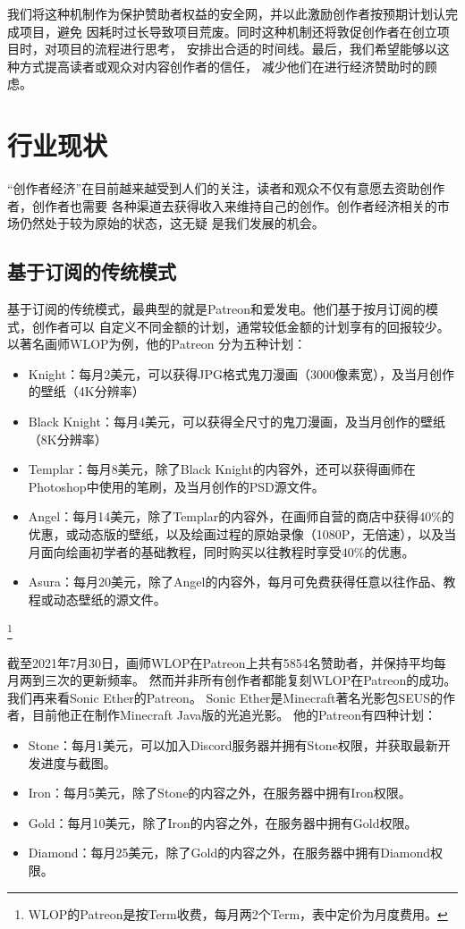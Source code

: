\documentclass[11pt,UTF8,a4paper]{ctexart}
\begin{document}
    我们将这种机制作为保护赞助者权益的安全网，并以此激励创作者按预期计划认完成项目，避免
    因耗时过长导致项目荒废。同时这种机制还将敦促创作者在创立项目时，对项目的流程进行思考，
    安排出合适的时间线。最后，我们希望能够以这种方式提高读者或观众对内容创作者的信任，
    减少他们在进行经济赞助时的顾虑。


    \section{行业现状}\label{sec:now}

    “创作者经济”在目前越来越受到人们的关注，读者和观众不仅有意愿去资助创作者，创作者也需要
    各种渠道去获得收入来维持自己的创作。创作者经济相关的市场仍然处于较为原始的状态，这无疑
    是我们发展的机会。

    \subsection{基于订阅的传统模式}\label{subsec:tradition_patreon}

    基于订阅的传统模式，最典型的就是Patreon和爱发电。他们基于按月订阅的模式，创作者可以
    自定义不同金额的计划，通常较低金额的计划享有的回报较少。以著名画师WLOP为例，他的Patreon
    分为五种计划\cite{wlop_patreon}：
    \begin{itemize}
        \item Knight：每月2美元，可以获得JPG格式鬼刀漫画（3000像素宽），及当月创作的壁纸（4K分辨率）
        \item Black Knight：每月4美元，可以获得全尺寸的鬼刀漫画，及当月创作的壁纸（8K分辨率）
        \item Templar：每月8美元，除了Black Knight的内容外，还可以获得画师在Photoshop中使用的笔刷，及当月创作的PSD源文件。
        \item Angel：每月14美元，除了Templar的内容外，在画师自营的商店中获得40\%的优惠，或动态版的壁纸，以及绘画过程的原始录像（1080P，无倍速），以及当月面向绘画初学者的基础教程，同时购买以往教程时享受40\%的优惠。
        \item Asura：每月20美元，除了Angel的内容外，每月可免费获得任意以往作品、教程或动态壁纸的源文件。
    \end{itemize}\footnote{WLOP的Patreon是按Term收费，每月两2个Term，表中定价为月度费用。}

    截至2021年7月30日，画师WLOP在Patreon上共有5854名赞助者，并保持平均每月两到三次的更新频率。
    然而并非所有创作者都能复刻WLOP在Patreon的成功。 我们再来看Sonic Ether的Patreon。
    Sonic Ether是Minecraft著名光影包SEUS的作者，目前他正在制作Minecraft Java版的光追光影。
    他的Patreon有四种计划\cite{seus_patreon}：
    \begin{itemize}
        \item Stone：每月1美元，可以加入Discord服务器并拥有Stone权限，并获取最新开发进度与截图。
        \item Iron：每月5美元，除了Stone的内容之外，在服务器中拥有Iron权限。
        \item Gold：每月10美元，除了Iron的内容之外，在服务器中拥有Gold权限。
        \item Diamond：每月25美元，除了Gold的内容之外，在服务器中拥有Diamond权限。
    \end{itemize}
\end{document}
